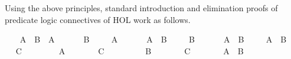 \begin{isabellebody}
\begin{isamarkuptext}
Using the above principles, standard introduction and elimination proofs
  of predicate logic connectives of HOL work as follows.%
\end{isamarkuptext}%
\isamarkuptrue%
\isamarkupfalse%
\isanewline
{}\isanewline
%
\isadelimproof
\ \ %
\endisadelimproof
%
\isatagproof
{}\isamarkupfalse%
\ {}A\ {}\ B{}\ \ A\ \isamarkupfalse%
\isanewline
\ \ \isamarkupfalse%
\ \isamarkupfalse%
\ B\ \isamarkupfalse%
\isanewline
\isanewline
\ \ \isamarkupfalse%
\ A\ \isamarkupfalse%
\isanewline
\ \ \isamarkupfalse%
\ \isamarkupfalse%
\ {}A\ {}\ B{}\ \isamarkupfalse%
\isanewline
\isanewline
\ \ \isamarkupfalse%
\ B\ \isamarkupfalse%
\isanewline
\ \ \isamarkupfalse%
\ \isamarkupfalse%
\ {}A\ {}\ B{}\ \isamarkupfalse%
\isanewline
\isanewline
\ \ \isamarkupfalse%
\ {}A\ {}\ B{}\ \isamarkupfalse%
\isanewline
\ \ \isamarkupfalse%
\ \isamarkupfalse%
\ C\isanewline
\ \ \isamarkupfalse%
\isanewline
\ \ \ \ \isamarkupfalse%
\ A\isanewline
\ \ \ \ \isamarkupfalse%
\ \isamarkupfalse%
\ C\ \isamarkupfalse%
\isanewline
\ \ \isamarkupfalse%
\isanewline
\ \ \ \ \isamarkupfalse%
\ B\isanewline
\ \ \ \ \isamarkupfalse%
\ \isamarkupfalse%
\ C\ \isamarkupfalse%
\isanewline
\ \ \isamarkupfalse%
\isanewline
\isanewline
\ \ \isamarkupfalse%
\ A\ \ B\ \isamarkupfalse%
\isanewline
\ \ \isamarkupfalse%

\end{isabellebody}

